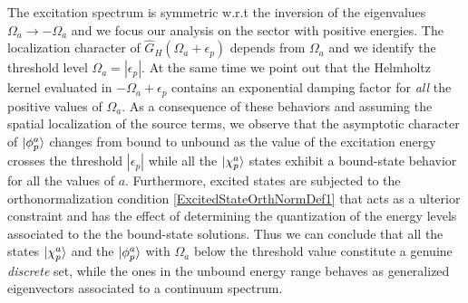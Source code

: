 \documentclass[reprint,aps,prb]{revtex4-1}
\newcommand{\eps}{\epsilon}
\newcommand{\op}[1]{\hat {#1}}
\begin{document}
The excitation spectrum is symmetric w.r.t the inversion of the eigenvalues $\Omega_a \rightarrow -\Omega_a$ and we focus our analysis on the sector with positive energies. The localization 
character of $\op G_H(\Omega_a+\eps_p)$ depends from $\Omega_a$ and we identify the threshold level $\Omega_a=|\eps_p|$. At the same time we point out that the Helmholtz kernel evaluated in 
$-\Omega_a+\eps_p$ contains an exponential damping factor for \emph{all} the positive values of $\Omega_a$.  As a consequence of these behaviors and assuming the spatial localization of 
the source terms,  we observe that the asymptotic character of $\ket{\phi^a_p}$ changes from bound to unbound as the value of the excitation energy crosses the threshold $|\eps_p|$ while all 
the $\ket{\chi^a_p}$ states exhibit a bound-state behavior for all the values of $a$. 
Furthermore, excited states are subjected to the orthonormalization condition \eqref{ExcitedStateOrthNormDef1} that acts as a ulterior constraint and has the effect of determining the quantization 
of the energy levels associated to the the bound-state solutions. Thus we can conclude that all the states $\ket{\chi^a_p}$ and the $\ket{\phi^a_p}$ with $\Omega_a$ below the threshold value constitute 
a genuine \emph{discrete} set, while the ones in the unbound energy range behaves as generalized eigenvectors associated to a continuum spectrum. 
\end{document}
